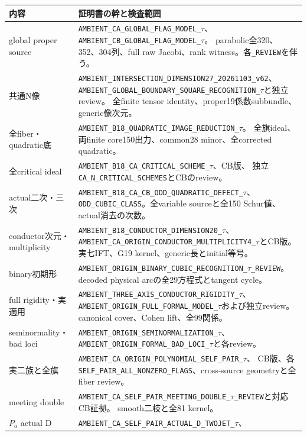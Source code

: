 \documentclass[11pt,a4paper]{ltjsarticle}
\theoremstyle{definition}
\theoremstyle{remark}
\begin{document}
\begin{longtable}{>{\raggedright\arraybackslash}p{}>{\raggedright\arraybackslash}p{}}
\toprule 内容 & 証明書の幹と検査範囲\\\midrule\endhead
global proper source & \texttt{AMBIENT\_CA\_GLOBAL\_FLAG\_MODEL\_}$\tau$、\texttt{AMBIENT\_CB\_GLOBAL\_FLAG\_MODEL\_}$\tau$。
parabolic全320、352、304列、full raw Jacobi、rank witness。各\texttt{\_REVIEW}を伴う。\\
共通N像 & \texttt{AMBIENT\_INTERSECTION\_DIMENSION27\_20261103\_v62}、
\texttt{AMBIENT\_GLOBAL\_BOUNDARY\_SQUARE\_RECOGNITION\_}$\tau$と独立review。
全finite tensor identity、proper19係数subbundle、generic像次元。\\
全fiber・quadratic底 & \texttt{AMBIENT\_B18\_QUADRATIC\_IMAGE\_REDUCTION\_}$\tau$。
全旗ideal、両finite core150出力、common28 minor、全corrected quadratic。\\
全critical ideal & \texttt{AMBIENT\_B18\_CA\_CRITICAL\_SCHEME\_}$\tau$、CB版、
独立\texttt{CA\_N\_CRITICAL\_SCHEMES}とCBのreview。\\
actual二次・三次 & \texttt{AMBIENT\_B18\_CA\_CB\_ODD\_QUADRATIC\_DEFECT\_}$\tau$、
\texttt{ODD\_CUBIC\_CLASS}。全variable sourceと全150 Schur値、actual消去の次数。\\
conductor次元・multiplicity & \texttt{AMBIENT\_B18\_CONDUCTOR\_DIMENSION20\_}$\tau$、
\texttt{AMBIENT\_CA\_ORIGIN\_CONDUCTOR\_MULTIPLICITY4\_}$\tau$とCB版。
実七IFT、G19 kernel、generic長とinitial等号。\\
binary初期形 & \texttt{AMBIENT\_ORIGIN\_BINARY\_CUBIC\_RECOGNITION\_}$\tau$\texttt{\_REVIEW}。
decoded physical arcの全29方程式とtangent cycle。\\
full rigidity・実適用 & \texttt{AMBIENT\_THREE\_AXIS\_CONDUCTOR\_RIGIDITY\_}$\tau$、
\texttt{AMBIENT\_ORIGIN\_FULL\_FORMAL\_MODEL\_}$\tau$および独立review。
canonical cover、Cohen lift、全99関係。\\
seminormality・bad loci & \texttt{AMBIENT\_ORIGIN\_SEMINORMALIZATION\_}$\tau$、
\texttt{AMBIENT\_ORIGIN\_FORMAL\_BAD\_LOCI\_}$\tau$と各review。\\
実二族と全旗 & \texttt{AMBIENT\_CA\_ORIGIN\_POLYNOMIAL\_SELF\_PAIR\_}$\tau$、
CB版、各\texttt{SELF\_PAIR\_ALL\_NONZERO\_FLAGS}、cross-source geometryと全fiber review。\\
meeting double & \texttt{AMBIENT\_CA\_SELF\_PAIR\_MEETING\_DOUBLE\_}$\tau$\texttt{\_REVIEW}と対応CB証拠。
smooth二枝と全81 kernel。\\
$P_a$ actual D & \texttt{AMBIENT\_CA\_SELF\_PAIR\_ACTUAL\_D\_TWOJET\_}$\tau$、

\end{longtable}
\end{document}
